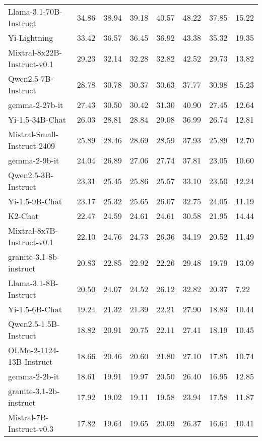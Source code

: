 {\begin{table}[H]
{\begin{tabular}{p{4cm}<{\raggedright\arraybackslash}*{7}{p{2cm}<{\centering\arraybackslash}}}
\rowcolor{color22}
Llama-3.1-70B-Instruct &34.86 & 38.94 & 39.18 & 40.57 & 48.22 & 37.85 &15.22 \\
\rowcolor{color22}
Yi-Lightning &33.42 & 36.57 & 36.45 & 36.92 & 43.38 & 35.32 &19.35 \\
\rowcolor{color22}
Mixtral-8x22B-Instruct-v0.1 &29.23 & 32.14 & 32.28 & 32.82 & 42.52 & 29.73 &13.82 \\
\rowcolor{color22}
Qwen2.5-7B-Instruct &28.78 & 30.78 & 30.37 & 30.63 & 37.77 & 30.98 &15.23 \\
\rowcolor{color22}
gemma-2-27b-it &27.43 & 30.50 & 30.42 & 31.30 & 40.90 & 27.45 &12.64 \\
\rowcolor{color22}
Yi-1.5-34B-Chat &26.03 & 28.81 & 28.84 & 29.08 & 36.99 & 26.74 &12.81 \\
\rowcolor{color22}
Mistral-Small-Instruct-2409 &25.89 & 28.46 & 28.69 & 28.59 & 37.93 & 25.89 &12.70 \\
\rowcolor{color22}
gemma-2-9b-it &24.04 & 26.89 & 27.06 & 27.74 & 37.81 & 23.05 &10.60 \\
\rowcolor{color22}
Qwen2.5-3B-Instruct &23.31 & 25.45 & 25.86 & 25.57 & 33.10 & 23.50 &12.24 \\
\rowcolor{color22}
Yi-1.5-9B-Chat &23.17 & 25.32 & 25.65 & 26.07 & 32.75 & 24.05 &11.19 \\
\rowcolor{color22}
K2-Chat &22.47 & 24.59 & 24.61 & 24.61 & 30.58 & 21.95 &14.44 \\
\rowcolor{color22}
Mixtral-8x7B-Instruct-v0.1 &22.10 & 24.76 & 24.73 & 26.36 & 34.19 & 20.52 &11.49 \\
\rowcolor{color22}
granite-3.1-8b-instruct &20.83 & 22.85 & 22.92 & 22.26 & 29.48 & 19.79 &13.09 \\
\rowcolor{color22}
Llama-3.1-8B-Instruct &20.50 & 24.07 & 24.52 & 26.12 & 32.82 & 20.37 &7.22 \\
\rowcolor{color22}
Yi-1.5-6B-Chat &19.24 & 21.32 & 21.39 & 22.21 & 27.90 & 18.83 &10.44 \\
\rowcolor{color22}
Qwen2.5-1.5B-Instruct &18.82 & 20.91 & 20.75 & 22.11 & 27.41 & 18.19 &10.45 \\
\rowcolor{color22}
OLMo-2-1124-13B-Instruct &18.66 & 20.46 & 20.60 & 21.80 & 27.10 & 17.85 &10.74 \\
\rowcolor{color22}
gemma-2-2b-it &18.61 & 19.91 & 19.97 & 20.50 & 26.40 & 16.95 &12.85 \\
\rowcolor{color22}
granite-3.1-2b-instruct &17.92 & 19.02 & 19.11 & 19.58 & 23.94 & 17.58 &11.87 \\
\rowcolor{color22}
Mistral-7B-Instruct-v0.3 &17.82 & 19.64 & 19.65 & 20.09 & 26.37 & 16.64 &10.41 \\

\end{tabular}}
\end{table}}
